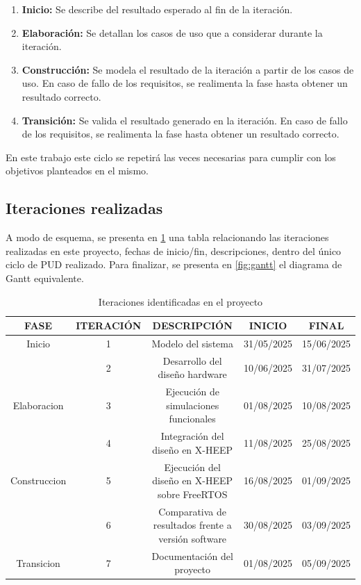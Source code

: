 \begin{enumerate}
    \item \textbf{Inicio:} Se describe del resultado esperado al fin de la iteración.
    \item \textbf{Elaboración:} Se detallan los casos de uso que a considerar durante la iteración.
    \item \textbf{Construcción:} Se modela el resultado de la iteración a partir de los casos de uso. En caso de fallo de los requisitos, se realimenta la fase hasta obtener un resultado correcto.
    \item \textbf{Transición:} Se valida el resultado generado en la iteración. En caso de fallo de los requisitos, se realimenta la fase hasta obtener un resultado correcto.
\end{enumerate}

En este trabajo este ciclo se repetirá las veces necesarias para cumplir con los objetivos planteados en el mismo.

\subsection{Iteraciones realizadas}
A modo de esquema, se presenta en \ref{tbl:cicloIteraciones} una tabla relacionando las iteraciones realizadas en este proyecto, fechas de inicio/fin, descripciones, dentro del único ciclo de PUD realizado. Para finalizar, se presenta en \ref{fig:gantt} el diagrama de Gantt equivalente.

\begin{table}[H]
    \centering
    \resizebox{15.5cm}{!} {
        \begin{tabular}{|c|c|c|c|c|}
        \hline
        \rowcolor[HTML]{C0C0C0} 
        \textbf{FASE} & \textbf{ITERACIÓN} & \textbf{DESCRIPCIÓN} & \textbf{INICIO} & \textbf{FINAL} \\ \hline
        \cellcolor[HTML]{EFEFEF}Inicio & 1 & Modelo del sistema & 31/05/2025 & 15/06/2025 \\ \hline 
        \cellcolor[HTML]{EFEFEF} & 2 & Desarrollo del diseño hardware & 10/06/2025 & 31/07/2025 \\ \cline{2-5} 
        \multirow{-2}{*}{\cellcolor[HTML]{EFEFEF}Elaboracion} & 3 & Ejecución de simulaciones funcionales & 01/08/2025 & 10/08/2025 \\ \hline
        \cellcolor[HTML]{EFEFEF} & 4 & Integración del diseño en X-HEEP & 11/08/2025 & 25/08/2025 \\ \cline{2-5} 
        \multirow{-2}{*}{\cellcolor[HTML]{EFEFEF}Construccion} & 5 & Ejecución del diseño en X-HEEP sobre FreeRTOS & 16/08/2025 & 01/09/2025 \\ \hline
        \cellcolor[HTML]{EFEFEF} & 6 & Comparativa de resultados frente a versión software & 30/08/2025 & 03/09/2025 \\ \cline{2-5} 
        \multirow{-2}{*}{\cellcolor[HTML]{EFEFEF}Transicion} & 7 & Documentación del proyecto & 01/08/2025 & 05/09/2025 \\ \hline
        \end{tabular}
    }
    \caption{Iteraciones identificadas en el proyecto}
    \label{tbl:cicloIteraciones}
\end{table}


